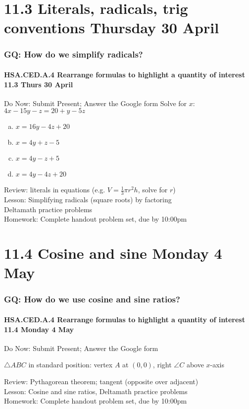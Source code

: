\documentclass{beamer}
\begin{document}
\section{11.3 Literals, radicals, trig conventions Thursday 30 April} 
\frame
{
  \frametitle{GQ: How do we simplify radicals?}
  \framesubtitle{HSA.CED.A.4 Rearrange formulas to highlight a quantity of interest \hfill \alert{11.3 Thurs 30 April}}

  \begin{block}{Do Now: Submit Present; Answer the Google form} \vspace{0.5cm}
    Solve for $x$: $4x-15y-z= 20+y-5z$
    \begin{multicols}{2}
    \begin{enumerate}[(a)]
      \item $x= 16y-4z+20$
      \item $x= 4y+z-5$
      \item $x= 4y-z+5$
      \item $x= 4y-4z+20$
    \end{enumerate}
  \end{multicols}
    \end{block}
    Review: literals in equations (e.g. $V=\frac{1}{3}\pi r^2h$, solve for $r$)\\[0.25cm]
    Lesson: Simplifying radicals (square roots) by factoring\\
    Deltamath practice problems \\[0.25cm]
    Homework: Complete handout problem set, due by 10:00pm}

\section{11.4 Cosine and sine Monday 4 May} 
\frame
{
  \frametitle{GQ: How do we use cosine and sine ratios?}
  \framesubtitle{HSA.CED.A.4 Rearrange formulas to highlight a quantity of interest \hfill \alert{11.4 Monday 4 May}}

  \begin{block}{Do Now: Submit Present; Answer the Google form} \vspace{0.5cm}
    \begin{multicols}{2}
      $\triangle ABC$ in standard position: vertex $A$ at $(0,0)$, right $\angle C$ above $x$-axis
  \end{multicols}
    \end{block}
    Review: Pythagorean theorem; tangent (opposite over adjacent)\\[0.25cm]
    Lesson: Cosine and sine ratios, 
    Deltamath practice problems \\[0.25cm]
    Homework: Complete handout problem set, due by 10:00pm}
\end{document}
